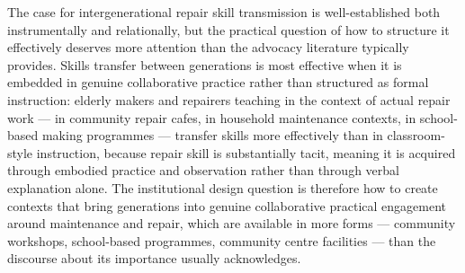 The case for intergenerational repair skill transmission is well-established both instrumentally and relationally, but the practical question of how to structure it effectively deserves more attention than the advocacy literature typically provides. Skills transfer between generations is most effective when it is embedded in genuine collaborative practice rather than structured as formal instruction: elderly makers and repairers teaching in the context of actual repair work — in community repair cafes, in household maintenance contexts, in school-based making programmes — transfer skills more effectively than in classroom-style instruction, because repair skill is substantially tacit, meaning it is acquired through embodied practice and observation rather than through verbal explanation alone. The institutional design question is therefore how to create contexts that bring generations into genuine collaborative practical engagement around maintenance and repair, which are available in more forms — community workshops, school-based programmes, community centre facilities — than the discourse about its importance usually acknowledges.

\separator


